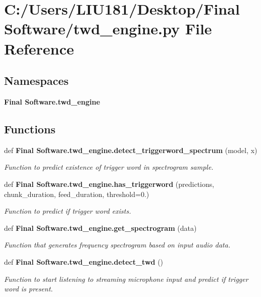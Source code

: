 \section{C\+:/\+Users/\+L\+I\+U181/\+Desktop/\+Final Software/twd\+\_\+engine.py File Reference}
\label{twd__engine_8py}
\subsection*{Namespaces}
\begin{DoxyCompactItemize}
\item 
 \textbf{ Final Software.\+twd\+\_\+engine}
\end{DoxyCompactItemize}
\subsection*{Functions}
\begin{DoxyCompactItemize}
\item 
def \textbf{ Final Software.\+twd\+\_\+engine.\+detect\+\_\+triggerword\+\_\+spectrum} (model, x)
\begin{DoxyCompactList}\small\item\em Function to predict existence of trigger word in spectrogram sample. \end{DoxyCompactList}\item 
def \textbf{ Final Software.\+twd\+\_\+engine.\+has\+\_\+triggerword} (predictions, chunk\+\_\+duration, feed\+\_\+duration, threshold=0.)
\begin{DoxyCompactList}\small\item\em Function to predict if trigger word exists. \end{DoxyCompactList}\item 
def \textbf{ Final Software.\+twd\+\_\+engine.\+get\+\_\+spectrogram} (data)
\begin{DoxyCompactList}\small\item\em Function that generates frequency spectrogram based on input audio data. \end{DoxyCompactList}\item 
def \textbf{ Final Software.\+twd\+\_\+engine.\+detect\+\_\+twd} ()
\begin{DoxyCompactList}\small\item\em Function to start listening to streaming microphone input and predict if trigger word is present. \end{DoxyCompactList}\end{DoxyCompactItemize}
